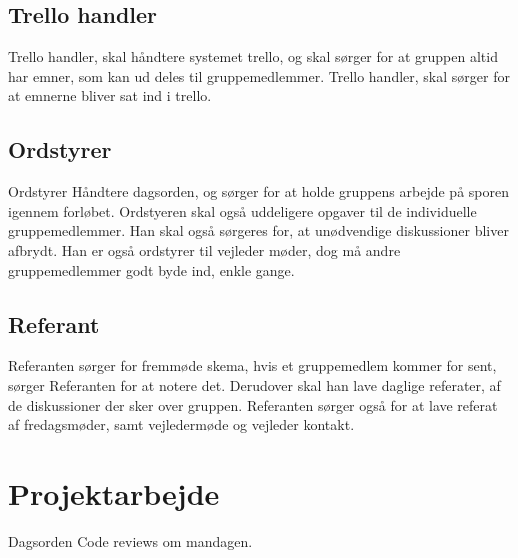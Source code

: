 \subsection{Trello handler}
Trello handler, skal håndtere systemet trello, og skal sørger for at gruppen altid har emner, som kan ud deles til gruppemedlemmer. Trello handler, skal sørger for at emnerne bliver sat ind i trello.

\subsection{Ordstyrer}
Ordstyrer Håndtere dagsorden, og sørger for at holde gruppens arbejde på sporen igennem forløbet. Ordstyeren skal også uddeligere opgaver til de individuelle gruppemedlemmer. Han skal også sørgeres for, at unødvendige diskussioner bliver afbrydt. Han er også ordstyrer til vejleder møder, dog må andre gruppemedlemmer godt byde ind, enkle gange.

\subsection{Referant}
Referanten sørger for fremmøde skema, hvis et gruppemedlem kommer for sent, sørger Referanten for at notere det. Derudover skal han lave daglige referater, af de diskussioner der sker over gruppen. Referanten sørger også for at lave referat af fredagsmøder, samt vejledermøde og vejleder kontakt. 

\section{Projektarbejde}
Dagsorden
Code reviews om mandagen.
